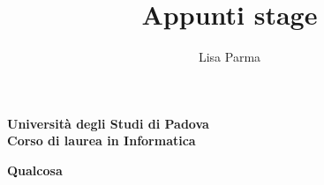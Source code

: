 \documentclass[a4paper, oneside, openany,12pt]{article}
\title{\textbf{Appunti stage}}
\author{Lisa Parma}
\begin{document}
	
\begin{titlepage}
	\begin{center}
	
		\textbf{Università degli Studi di Padova \\ Corso di laurea in Informatica}
		\vspace{1cm}
		\begin{center}
		\begin{Huge}
			\textbf{Qualcosa} \\
		\end{Huge}
	\end{center}
	\end{center}
\end{titlepage}

\tableofcontents

\end{document}
